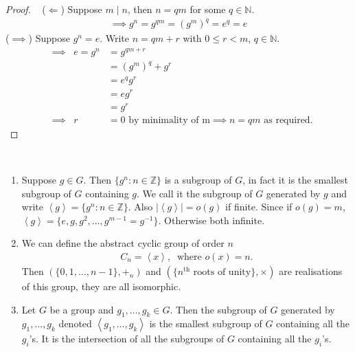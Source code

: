 \begin{proof} ~
($\Longleftarrow$) Suppose $m \mid n$, then $n = qm$ for some $q \in \mathbb{N}$.
\begin{align*}
    \implies g^n = g^{qm} = (g^m)^q = e^q = e
\end{align*}
($\implies$) Suppose $g^n = e$. Write $n = qm + r$ with $0 \leq r < m$, $q \in \mathbb{N}$.
\begin{align*}
    &\implies & e = g^n &= g^{qm + r} \\
    && &= (g^m)^q + g^r \\
    && &= e^q g^r \\
    && &= e g^r \\
    && &= g^r \\
    &\implies & r &= 0 \text{ by minimality of m} \implies n = qm \text{ as required.} 
\end{align*}
\end{proof}

\begin{remark} ~
\begin{enumerate}
\def\labelenumi{\roman{enumi}.}
\item
  Suppose $g \in G$. Then $\{ g^n : n \in \mathbb{Z} \}$ is a subgroup of $G$, in fact it is the smallest subgroup of $G$ containing $g$.
  We call it the subgroup of $G$ generated by $g$ and write $\left\langle g \right\rangle = \{ g^n : n \in \mathbb{Z} \}$. Also $|\left\langle g \right\rangle| = o(g)$ if finite.
  Since if $o(g) = m$, $\left\langle g \right\rangle = \{ e, g, g^2, \ldots, g^{m-1} = g^{-1 }\}$.
  Otherwise both infinite.
\item
  We can define the abstract cyclic group of order $n$
  \begin{align*}
  C_n = \left\langle x \right\rangle,\ \text{ where } o(x) = n.
  \end{align*}
  Then $( \{ 0, 1, \ldots, n-1 \}, +_n)$ and $( \{ n^{\text{th}} \text{ roots of unity}\}, \times)$ are realisations of this group, they are all isomorphic.
\item
  Let $G$ be a group and $g_1, \ldots, g_k \in G$. Then the subgroup of $G$ generated by $g_1, \ldots, g_k$ denoted $\left\langle g_1, \ldots, g_k \right\rangle$ is the smallest subgroup of $G$ containing all the $g_i$'s. It is the intersection of all the subgroups of $G$ containing all the $g_i$'s.
\end{enumerate}

\end{remark}